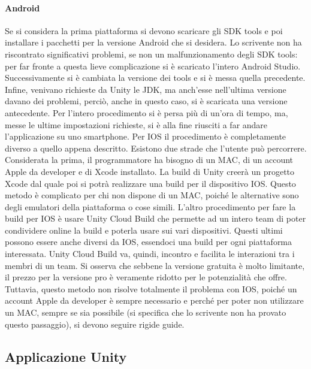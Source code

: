 \paragraph{Android}
Se si considera la prima piattaforma si devono scaricare gli SDK tools e poi installare i pacchetti per la versione Android che si desidera. Lo scrivente non ha riscontrato significativi problemi, se non un malfunzionamento degli SDK tools: per far fronte a questa lieve complicazione si è scaricato l’intero Android Studio. Successivamente si è cambiata la versione dei tools e si è messa quella precedente. Infine, venivano richieste da Unity le JDK, ma anch’esse nell’ultima versione davano dei problemi, perciò, anche in questo caso, si è scaricata una versione antecedente. Per l’intero procedimento si è persa più di un’ora di tempo, ma, messe le ultime impostazioni richieste, si è alla fine riusciti a far andare l’applicazione su uno smartphone.
Per IOS il procedimento è completamente diverso a quello appena descritto. Esistono due strade che l’utente può percorrere.
Considerata la prima, il programmatore ha bisogno di un MAC, di un account Apple da developer e di Xcode installato. La build di Unity creerà un progetto Xcode dal quale poi si potrà realizzare una build per il dispositivo IOS. Questo metodo è complicato per chi non dispone di un MAC, poiché le alternative sono degli emulatori della piattaforma o cose simili.
L’altro procedimento per fare la build per IOS è usare Unity Cloud Build che permette ad un intero team di poter condividere online la build e poterla usare sui vari dispositivi. Questi ultimi possono essere anche diversi da IOS, essendoci una build per ogni piattaforma interessata. Unity Cloud Build va, quindi, incontro e facilita le interazioni tra i membri di un team. Si osserva che sebbene la versione gratuita è molto limitante, il prezzo per la versione pro è veramente ridotto per le potenzialità che offre. Tuttavia, questo metodo non risolve totalmente il problema con IOS, poiché un account Apple da developer è sempre necessario e perché per poter non utilizzare un MAC, sempre se sia possibile (si specifica che lo scrivente non ha provato questo passaggio), si devono seguire rigide guide.


\subsection{Applicazione Unity}
